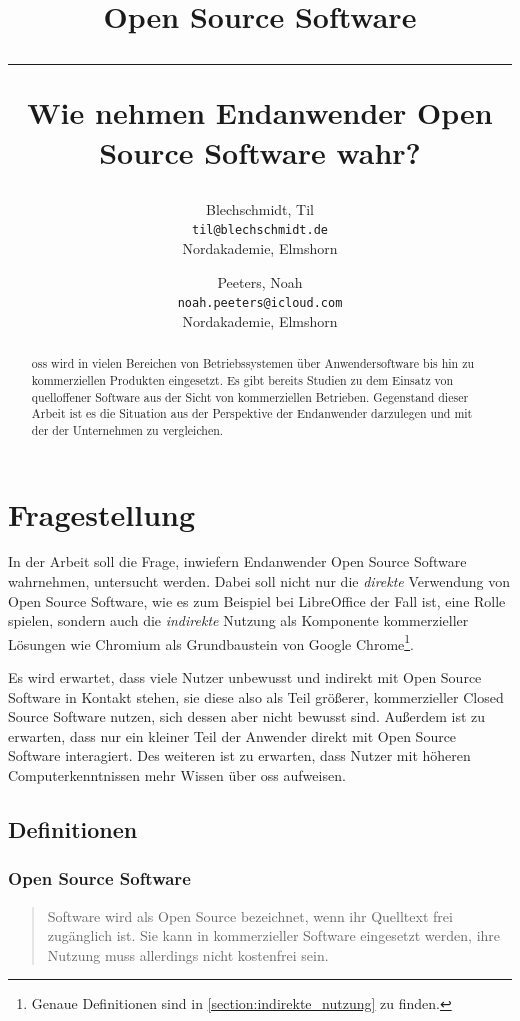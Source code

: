 \documentclass[a4paper]{article}
\title{Open Source Software \\
    \noindent\rule[0.25ex]{\linewidth}{0.5pt}
    \large Wie nehmen Endanwender Open Source Software wahr?
}
\author{
  Blechschmidt, Til\\
  \texttt{til@blechschmidt.de}\\
  Nordakademie, Elmshorn
  \and
  Peeters, Noah\\
  \texttt{noah.peeters@icloud.com}\\
  Nordakademie, Elmshorn
}
\begin{document}
    \thispagestyle{fancy}
    \maketitle

    \clearpage
    \begin{abstract}
         \gls{oss} wird in vielen Bereichen von Betriebssystemen über Anwendersoftware bis hin zu kommerziellen Produkten eingesetzt. Es gibt bereits Studien zu dem Einsatz von quelloffener Software aus der Sicht von kommerziellen Betrieben. Gegenstand dieser Arbeit ist es die Situation aus der Perspektive der Endanwender darzulegen und mit der der Unternehmen zu vergleichen.
    \end{abstract}
    \newpage

    \tableofcontents
    \listoffigures
    \listoftables
    \clearpage

    
                    
    \section{Fragestellung}\label{section:fragestellung}
        In der Arbeit soll die Frage, inwiefern Endanwender Open Source Software wahrnehmen, untersucht werden. Dabei soll nicht nur die \emph{direkte} Verwendung von Open Source Software, wie es zum Beispiel bei LibreOffice der Fall ist, eine Rolle spielen, sondern auch die \emph{indirekte} Nutzung als Komponente kommerzieller Lösungen wie Chromium als Grundbaustein von Google Chrome\footnote{Genaue Definitionen sind in \ref{section:indirekte_nutzung} zu finden.}.
		
		Es wird erwartet, dass viele Nutzer unbewusst und indirekt mit Open Source Software in Kontakt stehen, sie diese also als Teil größerer, kommerzieller Closed Source Software nutzen, sich dessen aber nicht bewusst sind. Außerdem ist zu erwarten, dass nur ein kleiner Teil der Anwender direkt mit Open Source Software interagiert\cite{oss:lotus-to-linux}. Des weiteren ist zu erwarten, dass Nutzer mit höheren Computerkenntnissen mehr Wissen über \gls{oss} aufweisen.

		\subsection{Definitionen} %
            \subsubsection{Open Source Software}
                \begin{quote} 
                    \centering 
                    Software wird als Open Source bezeichnet, wenn ihr Quelltext frei zugänglich ist. Sie kann in kommerzieller Software eingesetzt werden, ihre Nutzung muss allerdings nicht kostenfrei sein. 
                \end{quote}
                
\end{document}
